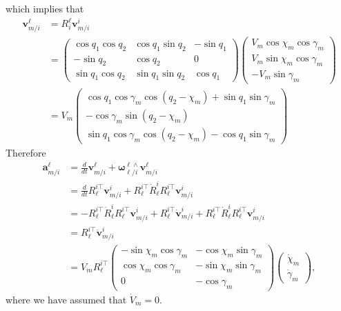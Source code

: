 \documentclass{article}
\newcommand{\abf}{\mathbf{a}}
\newcommand{\vbf}{\mathbf{v}}
\newcommand{\omegabf}{\boldsymbol{\omega}}
\begin{document}
which implies that
\begin{align*}
	\vbf_{m/i}^\ell &= R_i^\ell	\vbf_{m/i}^i \\
				    &= \begin{pmatrix} 
				    			\cos q_1 \cos q_2 & \cos q_1 \sin q_2 & -\sin q_1 \\ 
				    			-\sin q_2 & \cos q_2 & 0 \\ 
				    			\sin q_1\cos q_2 & \sin q_1 \sin q_2 & \cos q_1 \end{pmatrix}
				    		\begin{pmatrix} V_m \cos\chi_m \cos\gamma_m \\ V_m\sin\chi_m\cos\gamma_m \\ -V_m\sin\gamma_m \end{pmatrix} \\
				    &= V_m \begin{pmatrix}
 						 		\cos q_1 \cos\gamma_m \cos(q_2-\chi_m) + \sin q_1 \sin\gamma_m \\
 						 		-\cos\gamma_m \sin(q_2-\chi_m) \\
 						 		\sin q_1 \cos\gamma_m \cos(q_2-\chi_m) - \cos q_1 \sin\gamma_m 
 					       \end{pmatrix}
\end{align*}
Therefore
\begin{align*}
	\abf_{m/i}^\ell &= \frac{d}{dt}	\vbf_{m/i}^\ell + \omegabf_{\ell/i}^{\ell\wedge} \vbf_{m/i}^\ell \\
					&= \frac{d}{dt}	R_\ell^{i\top}	\vbf_{m/i}^i + R_\ell^{i\top}\dot{R}_\ell^i R_\ell^{i\top}	\vbf_{m/i}^i \\
					&= -	R_\ell^{i\top}\dot{R}_\ell^i R_\ell^{i\top} \vbf_{m/i}^i + R_\ell^{i\top} \dot{\vbf}_{m/i}^i + R_\ell^{i\top}\dot{R}_\ell^i R_\ell^{i\top} \vbf_{m/i}^i \\
					&= R_\ell^{i\top} \dot{\vbf}_{m/i}^i \\
					&= V_m R_\ell^{i\top}
				    		\begin{pmatrix}
				    			-\sin\chi_m \cos\gamma_m & -\cos\chi_m\sin\gamma_m \\ 
				    			\cos\chi_m\cos\gamma_m & -\sin\chi_m\sin\gamma_m \\ 
				    			0 & -\cos\gamma_m	
				    		\end{pmatrix}
				    		\begin{pmatrix}
				    			\dot{\chi}_m \\ \dot{\gamma}_m 
				    		\end{pmatrix},
\end{align*}
where we have assumed that $\dot{V}_m=0$.
\end{document}
